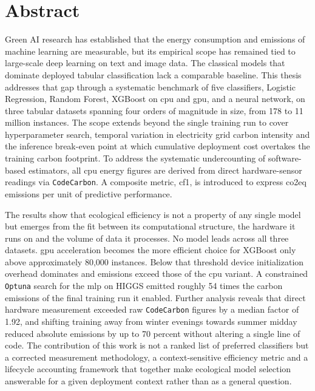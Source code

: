 \chapter*{Abstract}

Green AI research has established that the energy consumption and emissions of machine learning are measurable, but its empirical scope has remained tied to large-scale deep learning on text and image data. The classical models that dominate deployed tabular classification lack a comparable baseline. This thesis addresses that gap through a systematic benchmark of five classifiers, Logistic Regression, Random Forest, XGBoost on \acrshort{cpu} and \acrshort{gpu}, and a neural network, on three tabular datasets spanning four orders of magnitude in size, from 178 to 11 million instances. The scope extends beyond the single training run to cover hyperparameter search, temporal variation in electricity grid carbon intensity and the inference break-even point at which cumulative deployment cost overtakes the training carbon footprint. To address the systematic undercounting of software-based estimators, all \acrshort{cpu} energy figures are derived from direct hardware-sensor readings via \texttt{CodeCarbon}. A composite metric, \acrlong{cf1}, is introduced to express \acrlong{co2eq} emissions per unit of predictive performance.

The results show that ecological efficiency is not a property of any single model but emerges from the fit between its computational structure, the hardware it runs on and the volume of data it processes. No model leads across all three datasets. \acrshort{gpu} acceleration becomes the more efficient choice for XGBoost only above approximately 80{,}000 instances. Below that threshold device initialization overhead dominates and emissions exceed those of the \acrshort{cpu} variant. A constrained \texttt{Optuna} search for the \acrshort{mlp} on HIGGS emitted roughly 54 times the carbon emissions of the final training run it enabled. Further analysis reveals that direct hardware measurement exceeded raw \texttt{CodeCarbon} figures by a median factor of 1.92, and shifting training away from winter evenings towards summer midday reduced absolute emissions by up to 70 percent without altering a single line of code. The contribution of this work is not a ranked list of preferred classifiers but a corrected measurement methodology, a context-sensitive efficiency metric and a lifecycle accounting framework that together make ecological model selection answerable for a given deployment context rather than as a general question.
